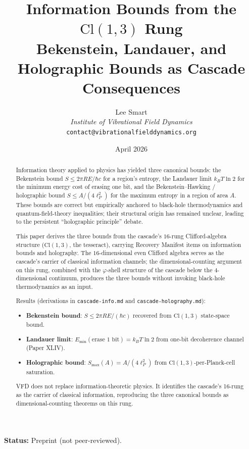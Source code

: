 \documentclass[12pt]{article}
\title{Information Bounds from the $\mathrm{Cl}(1,3)$ Rung\\[6pt]
\large Bekenstein, Landauer, and Holographic Bounds as Cascade Consequences}
\author{Lee Smart\\ \textit{Institute of Vibrational Field Dynamics}\\ \texttt{contact@vibrationalfielddynamics.org}}
\date{April 2026}
\theoremstyle{remark}
\begin{document}
\maketitle

\noindent\textbf{Status:} Preprint (not peer-reviewed).

\begin{abstract}
Information theory applied to physics has yielded three canonical bounds: the Bekenstein bound $S \le 2\pi R E/\hbar c$ for a region's entropy, the Landauer limit $k_B T \ln 2$ for the minimum energy cost of erasing one bit, and the Bekenstein--Hawking / holographic bound $S \le A/(4\ell_P^2)$ for the maximum entropy in a region of area $A$. These bounds are correct but empirically anchored to black-hole thermodynamics and quantum-field-theory inequalities; their structural origin has remained unclear, leading to the persistent ``holographic principle'' debate.

This paper derives the three bounds from the cascade's $16$-rung Clifford-algebra structure ($\mathrm{Cl}(1,3)$, the tesseract), carrying Recovery Manifest items on information bounds and holography. The $16$-dimensional even Clifford algebra serves as the cascade's carrier of classical information channels; the dimensional-counting argument on this rung, combined with the $\varphi$-shell structure of the cascade below the 4-dimensional continuum, produces the three bounds without invoking black-hole thermodynamics as an input.

Results (derivations in \texttt{cascade-info.md} and \texttt{cascade-holography.md}):
\begin{itemize}
\item \textbf{Bekenstein bound}: $S \le 2\pi R E / (\hbar c)$ recovered from $\mathrm{Cl}(1,3)$ state-space bound.
\item \textbf{Landauer limit}: $E_{\min}(\text{erase 1 bit}) = k_B T \ln 2$ from one-bit decoherence channel (Paper XLIV).
\item \textbf{Holographic bound}: $S_{\max}(A) = A / (4\ell_P^2)$ from $\mathrm{Cl}(1,3)$-per-Planck-cell saturation.
\end{itemize}
VFD does not replace information-theoretic physics. It identifies the cascade's 16-rung as the carrier of classical information, reproducing the three canonical bounds as dimensional-counting theorems on this rung.
\end{abstract}

\end{document}

